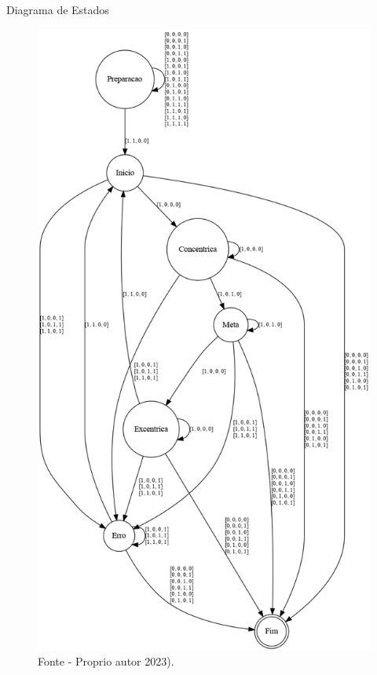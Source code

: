 \begin{frame}{Diagrama de Estados}

    \begin{figure}[!ht]
    \centering
    \includegraphics[scale=0.13]{img/desenvolvimento/estrategia/afd_barra.png}
    \caption*{Fonte - Proprio autor 2023).}
    \end{figure}
    
\end{frame}


